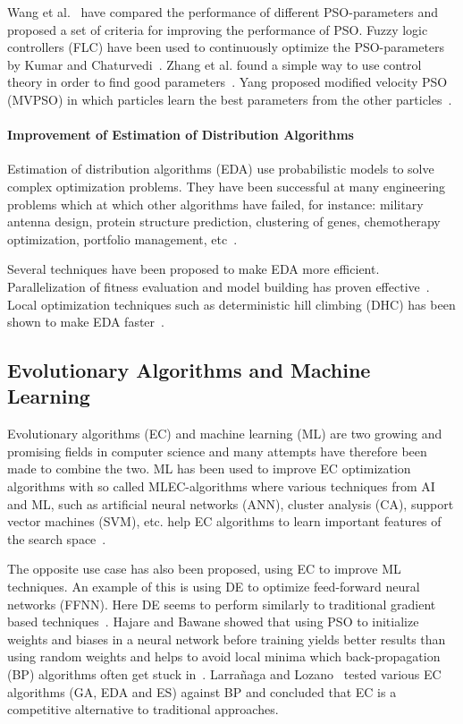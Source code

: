 Wang et al.~\cite{dang2012selection} have compared the performance of different PSO-parameters and proposed a set of criteria for improving the performance of PSO. Fuzzy logic controllers (FLC) have been used to continuously optimize the PSO-parameters by Kumar and Chaturvedi~\cite{kumar2011tuning}. Zhang et al. found a simple way to use control theory in order to find good parameters~\cite{zhang2011simple}. Yang proposed modified velocity PSO (MVPSO) in which particles learn the best parameters from the other particles~\cite{yang2011particle}.


\paragraph{Improvement of Estimation of Distribution Algorithms}

Estimation of distribution algorithms (EDA) use probabilistic models to solve complex optimization problems. They have been successful at many engineering problems which at which other algorithms have failed, for instance: military antenna design, protein structure prediction, clustering of genes, chemotherapy optimization, portfolio management, etc~\cite{Hauschild2011111}.

Several techniques have been proposed to make EDA more efficient. Parallelization of fitness evaluation and model building has proven effective~\cite{sastry2007towards}. Local optimization techniques such as deterministic hill climbing (DHC) has been shown to make EDA faster~\cite{hart1994adaptive}.

\subsection{Evolutionary Algorithms and Machine Learning}

Evolutionary algorithms (EC) and machine learning (ML) are two growing and promising fields in computer science and many attempts have therefore been made to combine the two. ML has been used to improve EC optimization algorithms with so called MLEC-algorithms where various techniques from AI and ML, such as artificial neural networks (ANN), cluster analysis (CA), support vector machines (SVM), etc. help EC algorithms to learn important features of the search space~\cite{6052374}.

The opposite use case has also been proposed, using EC to improve ML techniques. An example of this is using DE to optimize feed-forward neural networks (FFNN). Here DE seems to perform similarly to traditional gradient based techniques~\cite{ilonen2003differential}. Hajare and Bawane showed that using PSO to initialize weights and biases in a neural network before training yields better results than using random weights and helps to avoid local minima which back-propagation (BP) algorithms often get stuck in~\cite{hajare2015feed}. Larra{\~n}aga and Lozano~\cite{larranaga2001estimation} tested various EC algorithms (GA, EDA and ES) against BP and concluded that EC is a competitive alternative to traditional approaches.

